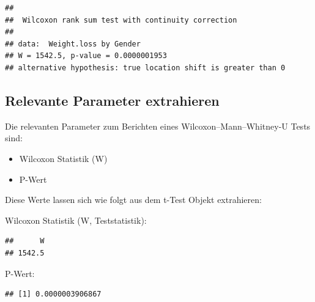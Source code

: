 \documentclass[
]{book}
\newenvironment{Shaded}{\begin{snugshade}}{\end{snugshade}}
\newcommand{\AttributeTok}[1]{\textcolor[rgb]{0.77,0.63,0.00}{#1}}
\newcommand{\ConstantTok}[1]{\textcolor[rgb]{0.00,0.00,0.00}{#1}}
\newcommand{\FunctionTok}[1]{\textcolor[rgb]{0.00,0.00,0.00}{#1}}
\newcommand{\NormalTok}[1]{#1}
\newcommand{\SpecialCharTok}[1]{\textcolor[rgb]{0.00,0.00,0.00}{#1}}
\providecommand{\tightlist}{%
  \setlength{\itemsep}{0pt}\setlength{\parskip}{0pt}}
\begin{document}
\begin{verbatim}
## 
##  Wilcoxon rank sum test with continuity correction
## 
## data:  Weight.loss by Gender
## W = 1542.5, p-value = 0.0000001953
## alternative hypothesis: true location shift is greater than 0
\end{verbatim}

\hypertarget{relevante-parameter-extrahieren-2}{%
\subsection{Relevante Parameter extrahieren}\label{relevante-parameter-extrahieren-2}}

Die relevanten Parameter zum Berichten eines Wilcoxon--Mann--Whitney-U Tests sind:

\begin{itemize}
\tightlist
\item
  Wilcoxon Statistik (W)
\item
  P-Wert
\end{itemize}

Diese Werte lassen sich wie folgt aus dem t-Test Objekt extrahieren:

Wilcoxon Statistik (W, Teststatistik):

\begin{Shaded}
\end{Shaded}

\begin{verbatim}
##      W 
## 1542.5
\end{verbatim}

P-Wert:

\begin{Shaded}
\end{Shaded}

\begin{verbatim}
## [1] 0.0000003906867
\end{verbatim}
\end{document}
